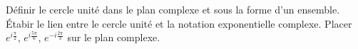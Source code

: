 %
%
	\begin{tasks}
		\task Définir le cercle unité dans le plan complexe et sous la forme d'un ensemble.
		\task Étabir le lien entre le cercle unité et la notation exponentielle complexe.
		\task Placer $e^{i\frac{\pi}{2}}$, $e^{i\frac{5\pi}{6}}$, $e^{-i\frac{2\pi}{3}}$ sur le plan complexe.
	\end{tasks}

